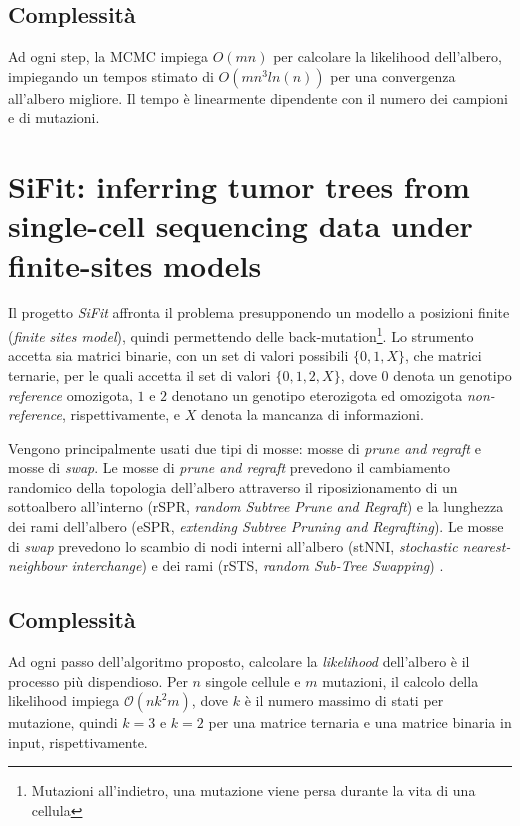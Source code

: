 \subsection{Complessità}
Ad ogni step, la MCMC impiega $O(mn)$ per calcolare la likelihood dell'albero, impiegando un tempos stimato di $O(mn^3 ln(n))$ per una convergenza all'albero migliore. Il tempo è linearmente dipendente con il numero dei campioni e di mutazioni.

\section{SiFit: inferring tumor trees from single-cell sequencing data under finite-sites models \cite{sifit}}
\label{chap:art-sifit}
Il progetto \textit{SiFit} affronta il problema presupponendo un modello a posizioni finite (\textit{finite sites model}), quindi permettendo delle back-mutation\footnote{Mutazioni all'indietro, una mutazione viene persa durante la vita di una cellula}.
Lo strumento accetta sia matrici binarie, con un set di valori possibili $\{ 0, 1, X \}$, che matrici ternarie, per le quali accetta il set di valori $\{ 0, 1, 2, X \}$, dove $0$ denota un genotipo \textit{reference} omozigota, $1$ e $2$ denotano un genotipo eterozigota ed omozigota \textit{non-reference}, rispettivamente, e $X$ denota la mancanza di informazioni.

Vengono principalmente usati due tipi di mosse: mosse di \textit{prune and regraft} e mosse di \textit{swap}. Le mosse di \textit{prune and regraft} prevedono il cambiamento randomico della topologia dell'albero attraverso il riposizionamento di un sottoalbero all'interno (rSPR, \textit{random Subtree Prune and Regraft}) e la lunghezza dei rami dell'albero (eSPR, \textit{extending Subtree Pruning and Regrafting}). Le mosse di \textit{swap} prevedono lo scambio di nodi interni all'albero (stNNI, \textit{stochastic nearest-neighbour interchange}) e dei rami (rSTS, \textit{random Sub-Tree Swapping}) \cite{sifit, efficiencymcmc}.

\subsection{Complessità}
Ad ogni passo dell'algoritmo proposto, calcolare la \textit{likelihood} dell'albero è il processo più dispendioso. Per $n$ singole cellule e $m$ mutazioni, il calcolo della likelihood impiega $\mathcal{O} (nk^2m)$, dove $k$ è il numero massimo di stati per mutazione, quindi $k = 3$ e $k = 2$ per una matrice ternaria e una matrice binaria in input, rispettivamente.

